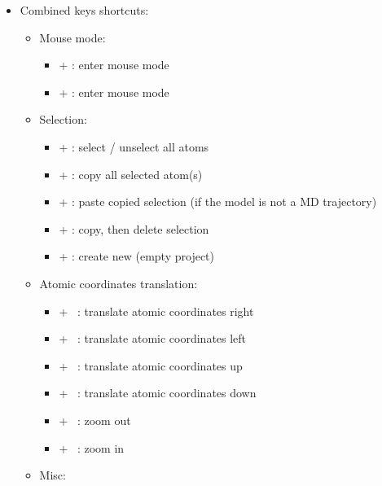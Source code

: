 {\begin{itemize}
\begin{itemize}
\begin{itemize}
\item[] \UArrow\ : rotate atomic coordinates up
\item[] \DArrow\ : rotate atomic coordinates down 
\end{itemize}
\item Misc:
\begin{itemize}
\item[] \Esc\ : exit fullscreen mode
\item[] \Del\ : Delete all selected atom(s)
\end{itemize}
\end{itemize}
\item Combined keys shortcuts:
\begin{itemize}
\item Mouse mode:
\begin{itemize}
\item[] \Alt +  : enter mouse  mode
\item[] \Alt +  : enter mouse  mode 
\end{itemize}
\item Selection:
\begin{itemize}
\item[] \Ctrl +  : select / unselect all atoms
\item[] \Ctrl +  : copy all selected atom(s)
\item[] \Ctrl +  : paste copied selection (if the model is not a MD trajectory)
\item[] \Ctrl +  : copy, then delete selection
\item[] \Ctrl +  : create new (empty project) 
\end{itemize}
\item Atomic coordinates translation:
\begin{itemize}
\item[] \Ctrl + \RArrow\ : translate atomic coordinates right
\item[] \Ctrl + \LArrow\ : translate atomic coordinates left
\item[] \Ctrl + \UArrow\ : translate atomic coordinates up
\item[] \Ctrl + \DArrow\ : translate atomic coordinates down
\item[] \Shift + \UArrow\ : zoom out
\item[] \Shift + \DArrow\ : zoom in \\
\end{itemize}
\item Misc:

\end{itemize}
\end{itemize}}
